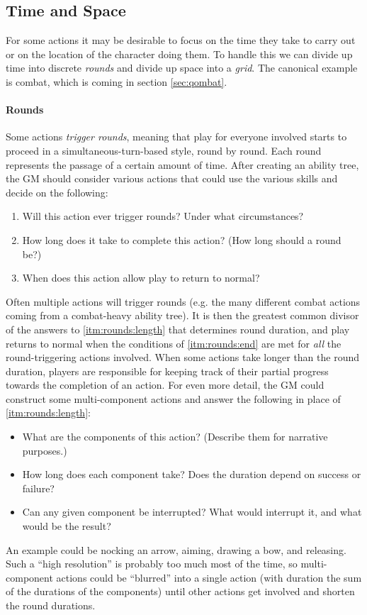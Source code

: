\documentclass[12pt]{article}
\begin{document}
\subsection{Time and Space}

For some actions it may be desirable to focus on the time they take to carry out
or on the location of the character doing them.
To handle this we can divide up time into discrete \emph{rounds} and divide up space into a \emph{grid}.
The canonical example is combat, which is coming in section \ref{sec:qombat}.

\paragraph{Rounds}
Some actions \emph{trigger rounds},
meaning that play for everyone involved starts to proceed in a simultaneous-turn-based style,
round by round.
Each round represents the passage of a certain amount of time.
After creating an ability tree, the GM should consider various actions
that could use the various skills and decide on the following:
\vspace{-1em}
\begin{enumerate}
\item\label{itm:rounds:trigger}
Will this action ever trigger rounds? Under what circumstances?
\item\label{itm:rounds:length}
How long does it take to complete this action? (How long should a round be?)
\item\label{itm:rounds:end}
When does this action allow play to return to normal?
\end{enumerate}
Often multiple actions will trigger rounds 
(e.g. the many different combat actions coming from a combat-heavy ability tree).
It is then the greatest common divisor of the answers to \ref{itm:rounds:length} that determines round duration,
and play returns to normal when the conditions of \ref{itm:rounds:end} are met for \emph{all} the round-triggering actions involved.
When some actions take longer than the round duration, players are responsible for keeping track of their partial progress towards
the completion of an action.
For even more detail, the GM could construct some multi-component actions and answer the following in place of \ref{itm:rounds:length}:
\vspace{-1em}
\begin{itemize}
\item What are the components of this action? (Describe them for narrative purposes.)
\item How long does each component take? Does the duration depend on success or failure?
\item Can any given component be interrupted? What would interrupt it, and what would be the result?
\end{itemize}
An example could be nocking an arrow, aiming, drawing a bow, and releasing.
Such a ``high resolution'' is probably too much most of the time, so multi-component actions could be ``blurred'' into a single
action (with duration the sum of the durations of the components) until other actions get involved and shorten the round durations.
\end{document}
